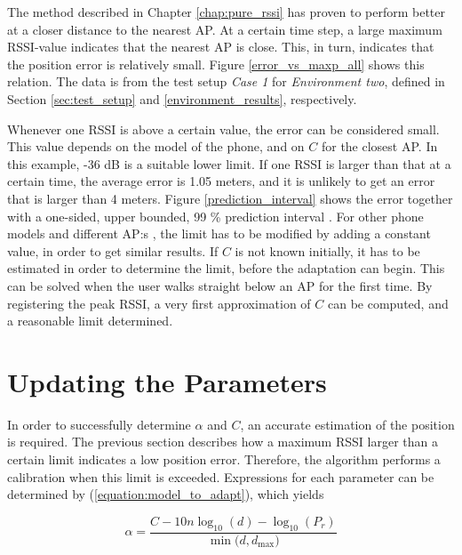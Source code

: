 \documentclass{LTHthesis}
\begin{document}
The method described in Chapter \ref{chap:pure_rssi} has proven to perform better at a closer distance to the nearest AP. At a certain time step, a large maximum RSSI-value indicates that the nearest AP is close. This, in turn, indicates that the position error is relatively small. Figure \ref{error_vs_maxp_all} shows this relation. The data is from the test setup \emph{Case 1} for \emph{Environment two}, defined in Section \ref{sec:test_setup} and \ref{environment_results}, respectively.

Whenever one RSSI is above a certain value, the error can be considered small. This value depends on the model of the phone, and on $C$ for the closest AP. In this example, -36 dB is a suitable lower limit. If one RSSI is larger than that at a certain time, the average error is 1.05 meters, and it is unlikely to get an error that is larger than 4 meters. Figure \ref{prediction_interval} shows the error together with a one-sided, upper bounded, 99 \% prediction interval \cite{matstat}. For other phone models and different AP:s , the limit has to be modified by adding a constant value, in order to get similar results. If $C$ is not known initially, it has to be estimated in order to determine the limit, before the adaptation can begin.  This can be solved when the user walks straight below an AP for the first time. By registering the peak RSSI, a very first approximation of $C$ can be computed, and a reasonable limit determined.

%
\section{Updating the Parameters} %
%
In order to successfully determine $\alpha$ and $C$, an accurate estimation of the position is required. The previous section describes how a maximum RSSI larger than a certain limit indicates a low position error. Therefore, the algorithm performs a calibration when this limit is exceeded. Expressions for each parameter can be determined by (\ref{equation:model_to_adapt}), which yields

%
\begin{equation}
\alpha=\frac{C-10n\log_{10}(d)-\log_{10}(P_r)}{\min({d, d_{\text{max}})}}
\label{equation:update_alpha}
\end{equation}
%
\end{document}
